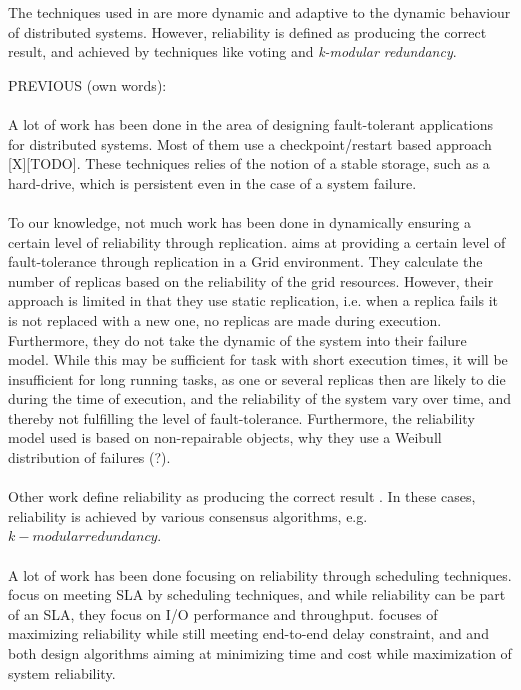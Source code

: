 \documentclass{cslthse-msc}
\begin{document}
The techniques used in \cite{selfAdaptRel} \cite{dynAdaptRepl} are more dynamic and adaptive to the dynamic behaviour of distributed systems. However, reliability is defined as producing the correct result, and achieved by techniques like voting and \emph{k-modular redundancy}.



\iffalse %
\newpage
PREVIOUS (own words):
\\\\
A lot of work has been done in the area of designing fault-tolerant applications for distributed systems. Most of them use a checkpoint/restart based approach [X][TODO]. These techniques relies of the notion of a stable storage, such as a hard-drive, which is persistent even in the case of a system failure.
\\\\
To our knowledge, not much work has been done in dynamically ensuring a certain level of reliability through replication.\cite{effTaskReplMobGrid} aims at providing a certain level of fault-tolerance through replication in a Grid environment. They calculate the number of replicas based on the reliability of the grid resources. However, their approach is limited in that they use static replication, i.e. when a replica fails it is not replaced with a new one, no replicas are made during execution. Furthermore, they do not take the dynamic of the system into their failure model. While this may be sufficient for task with short execution times, it will be insufficient for long running tasks, as one or several replicas then are likely to die during the time of execution, and the reliability of the system vary over time, and thereby not fulfilling the level of fault-tolerance. Furthermore, the reliability model used is based on non-repairable objects, why they use a Weibull distribution of failures (?).
\\\\
Other work define reliability as producing the correct result \cite{selfAdaptRel} \cite{imprRelAdaptRL} \cite{X}. In these cases, reliability is achieved by various consensus algorithms, e.g. $k-modular redundancy$. 
\\\\
A lot of work has been done focusing on reliability through scheduling techniques. \cite{SLASched} focus on meeting SLA by scheduling techniques, and while reliability can be part of an SLA, they focus on I/O performance and throughput. \cite{algoMaxRelEndToEndConstraint} focuses of maximizing reliability while still meeting end-to-end delay constraint, and \cite{algoMinExTime} and \cite{algoOptTimeMaxRel} both design algorithms aiming at minimizing time and cost while maximization of system reliability.
\end{document}
